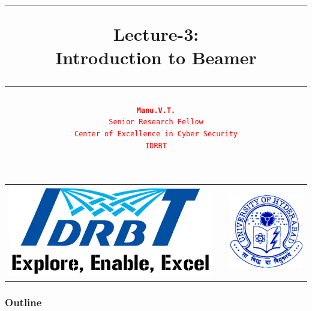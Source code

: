 \documentclass[12pt]{beamer}
\date{}
\title{\textcolor{idrbt_blue}{\rule{112mm}{1.25mm}} \textbf{Lecture-3:\\ Introduction to Beamer}
	 \textcolor{idrbt_blue}{\rule{112mm}{1.25mm}}}
\author{\textcolor{red}{\texttt{\textbf{Manu.V.T.}\\ 
			{\scriptsize Senior Research Fellow\\ Center of Excellence in Cyber Security\\IDRBT}}} }%
\begin{document}
	
	\begin{frame}
	\titlepage
	


\begin{center}
			\begin{tabular}{l>{\centering}p{6.25cm}<{\centering}l}
			\multirow{1}{*}{\includegraphics[scale=0.15]{./IDRBT_lowres.png}}
			&
         
			&
			\multirow{1}{*}{\includegraphics[scale=0.2]{./uoh.png}}
		\end{tabular}
\end{center}

\smallskip
	\renewcommand*{\arraystretch}{1.05}



\end{frame}

\begin{frame}
\frametitle{Outline}
\tableofcontents %
\end{frame}
\end{document}
